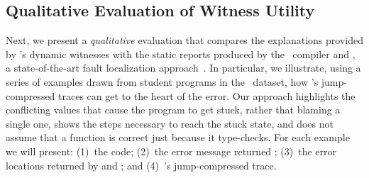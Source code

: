 \subsection{Qualitative Evaluation of Witness Utility}\label{sec:nanomaly:advantage-traces}

Next, we present a \emph{qualitative} evaluation that compares
the explanations provided by \toolname's dynamic witnesses with
the static reports produced by the \ocaml\ compiler and \sherrloc,
a state-of-the-art fault localization approach~\cite{Zhang2014-lv}.
%
In particular, we illustrate, using a series of examples drawn
from student programs in the \ucsdbench\ dataset, how \toolname's
jump-compressed traces can get to the heart of the error. Our approach
%
highlights the conflicting values that cause the program to get
stuck, rather that blaming a single one,
%
shows the steps necessary to reach the stuck state, and
%
does not assume that a function is correct just because it type-checks.
%
For each example we will present:
(1)~the code;
(2)~the error message returned \ocaml;
(3)~the error locations returned by \hlOcaml{\ocaml} and \hlSherrloc{\sherrloc};
and (4)~\toolname's jump-compressed trace.



